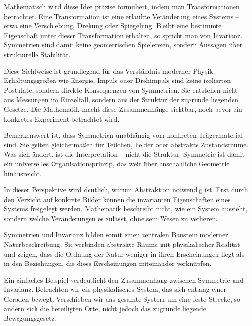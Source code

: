Mathematisch wird diese Idee präzise formuliert, indem man Transformationen betrachtet. Eine Transformation ist eine erlaubte Veränderung eines Systems – etwa eine Verschiebung, Drehung oder Spiegelung. Bleibt eine bestimmte Eigenschaft unter dieser Transformation erhalten, so spricht man von Invarianz. Symmetrien sind damit keine geometrischen Spielereien, sondern Aussagen über strukturelle Stabilität.

Diese Sichtweise ist grundlegend für das Verständnis moderner Physik. Erhaltungsgrößen wie Energie, Impuls oder Drehimpuls sind keine isolierten Postulate, sondern direkte Konsequenzen von Symmetrien. Sie entstehen nicht aus Messungen im Einzelfall, sondern aus der Struktur der zugrunde liegenden Gesetze. Die Mathematik macht diese Zusammenhänge sichtbar, noch bevor ein konkretes Experiment betrachtet wird.

Bemerkenswert ist, dass Symmetrien unabhängig vom konkreten Trägermaterial sind. Sie gelten gleichermaßen für Teilchen, Felder oder abstrakte Zustandsräume. Was sich ändert, ist die Interpretation – nicht die Struktur. Symmetrie ist damit ein universelles Organisationsprinzip, das weit über anschauliche Geometrie hinausreicht.

In dieser Perspektive wird deutlich, warum Abstraktion notwendig ist. Erst durch den Verzicht auf konkrete Bilder können die invarianten Eigenschaften eines Systems freigelegt werden. Mathematik beschreibt nicht, wie ein System aussieht, sondern welche Veränderungen es zulässt, ohne sein Wesen zu verlieren.

Symmetrien und Invarianz bilden somit einen zentralen Baustein moderner Naturbeschreibung. Sie verbinden abstrakte Räume mit physikalischer Realität und zeigen, dass die Ordnung der Natur weniger in ihren Erscheinungen liegt als in den Beziehungen, die diese Erscheinungen miteinander verknüpfen.

Ein einfaches Beispiel verdeutlicht den Zusammenhang zwischen Symmetrie und Invarianz. Betrachten wir ein physikalisches System, das sich entlang einer Geraden bewegt. Verschieben wir das gesamte System um eine feste Strecke, so ändern sich die beteiligten Orte, nicht jedoch das zugrunde liegende Bewegungsgesetz.

